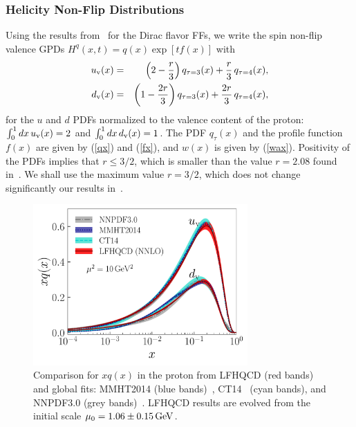 \documentclass[aps,prl,reprint,groupedaddress, preprintnumbers]{revtex4-1}
\def\bea{\begin{eqnarray}}
\def\eea{\end{eqnarray}}
\newcommand{\req}[1]{(\ref{#1})}
\begin{document}
\subsubsection{Helicity Non-Flip Distributions}

Using the results from~\cite{Sufian:2016hwn} for the Dirac flavor FFs, we write the spin non-flip valence GPDs $H^q(x,t) = q(x) \exp \left[t f(x)\right]$ with
\bea
u_{\rm v}(x) &=& \left(2-\frac{r}{3}\right)q_{\tau=3}(x) +\frac{r}{3} \, q_{\tau=4}(x), \label{ux}\\
d_{\rm v}(x) &=&  \left(1-\frac{2 r}{3}\right) q_{\tau=3}(x) +\frac{2 r}{3} \, q_{\tau=4}(x) \label{dx} ,
\eea
for the $u$ and $d$ PDFs normalized to the valence content of the proton:
$ \int_0^1 dx \, u_{\rm v}(x) = 2$ and $\int_0^1 dx  \, d_{\rm v}(x)=1$. 
The PDF $q_\tau(x)$ and the profile function $f(x)$ are given by \req{qx} and \req{fx}, and $w(x)$ is given by \req{wax}. 
Positivity of the PDFs implies that $r \le 3/2$, which is smaller than the value $r=2.08$ found in~\cite{Sufian:2016hwn}. We shall use the maximum value $r = 3/2$, which does not change significantly our results in~\cite{Sufian:2016hwn}.



\begin{figure}[htbp] 
\begin{center} 
\includegraphics[width=8.2cm]{proton-more-xf.pdf}
\setlength\abovecaptionskip{-4pt}
\setlength\belowcaptionskip{-6pt}
\caption{\label{globalfit}  Comparison for $x q(x)$ in the proton from LFHQCD (red bands) and global fits: MMHT2014 (blue bands)~\cite{Harland-Lang:2014zoa}, CT14~\cite{Dulat:2015mca} (cyan bands), and NNPDF3.0 (grey bands)~\cite{Ball:2014uwa}. LFHQCD results are evolved from the initial  scale $\mu_0 = 1.06 \pm 0.15 \,\rm GeV$.}
\label{globalfits}
\end{center}
\end{figure}
\end{document}
